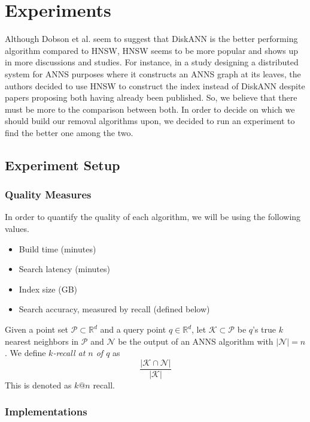 \chapter{Experiments}

Although Dobson et al. \cite{annscaling} seem to suggest that DiskANN is the better performing algorithm compared to HNSW, HNSW seems to be more popular and shows up in more discussions and studies. For instance, in a study designing a distributed system for ANNS purposes \cite{lanns} where it constructs an ANNS graph at its leaves, the authors decided to use HNSW to construct the index instead of DiskANN despite papers proposing both having already been published. So, we believe that there must be more to the comparison between both. In order to decide on which we should build our removal algorithms upon, we decided to run an experiment to find the better one among the two.

\section{Experiment Setup}

\subsection{Quality Measures}

In order to quantify the quality of each algorithm, we will be using the following values.
\begin{itemize}
    \item Build time (minutes)
    \item Search latency (minutes)
    \item Index size (GB)
    \item Search accuracy, measured by recall (defined below)
\end{itemize}

\begin{definition}[Recall]
    Given a point set \(\mathcal{P} \subset \mathbb{R}^d\) and a query point \(q \in \mathbb{R}^d\), let \(\mathcal{K} \subset \mathcal{P}\) be \(q\)'s true \(k\) nearest neighbors in \(\mathcal{P}\) and \(\mathcal{N}\) be the output of an ANNS algorithm with \(|\mathcal{N}| = n\). We define \textit{\(k\)-recall at \(n\) of \(q\)} as
    \[
        \frac{|\mathcal{K} \cap \mathcal{N}|}{|\mathcal{K}|}
    \]
    This is denoted as \(k@n\) recall.
\end{definition}
 
\subsection{Implementations}


